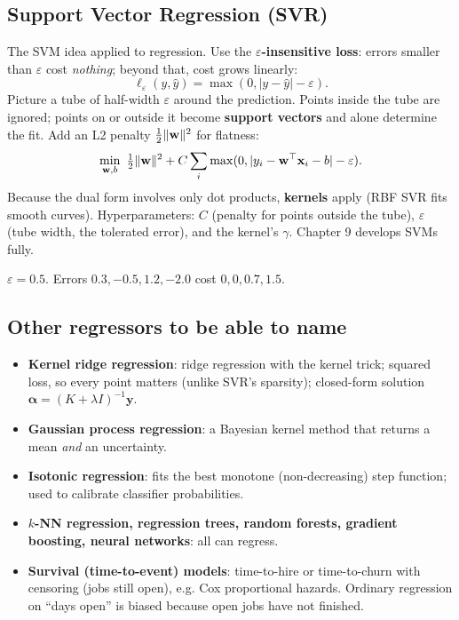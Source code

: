 \subsection{Support Vector Regression (SVR)}
The SVM idea applied to regression. Use the \textbf{$\varepsilon$-insensitive loss}: errors smaller than $\varepsilon$ cost
\emph{nothing}; beyond that, cost grows linearly:
\[ \ell_\varepsilon(y,\hat y) = \max(0, |y - \hat y| - \varepsilon). \]
Picture a tube of half-width $\varepsilon$ around the prediction. Points inside the tube are ignored; points on or outside
it become \textbf{support vectors} and alone determine the fit. Add an L2 penalty $\frac12\lVert \mathbf w\rVert^2$ for flatness:
\[ \min_{\mathbf w,b}\ \tfrac12\lVert \mathbf w\rVert^2 + C\sum_i\max(0,|y_i - \mathbf w^\top\mathbf x_i - b| - \varepsilon). \]
Because the dual form involves only dot products, \textbf{kernels} apply (RBF SVR fits smooth curves). Hyperparameters:
$C$ (penalty for points outside the tube), $\varepsilon$ (tube width, the tolerated error), and the kernel's $\gamma$.
Chapter 9 develops SVMs fully.

\begin{example}
$\varepsilon = 0.5$. Errors $0.3, -0.5, 1.2, -2.0$ cost $0, 0, 0.7, 1.5$.
\end{example}

\subsection{Other regressors to be able to name}
\begin{itemize}
\item \textbf{Kernel ridge regression}: ridge regression with the kernel trick; squared loss, so every point matters
  (unlike SVR's sparsity); closed-form solution $\boldsymbol\alpha = (K + \lambda I)^{-1}\mathbf y$.
\item \textbf{Gaussian process regression}: a Bayesian kernel method that returns a mean \emph{and} an uncertainty.
\item \textbf{Isotonic regression}: fits the best monotone (non-decreasing) step function; used to calibrate classifier
  probabilities.
\item \textbf{$k$-NN regression, regression trees, random forests, gradient boosting, neural networks}: all can regress.
\item \textbf{Survival (time-to-event) models}: time-to-hire or time-to-churn with censoring (jobs still open), e.g. Cox
  proportional hazards. Ordinary regression on ``days open'' is biased because open jobs have not finished.
\end{itemize}

